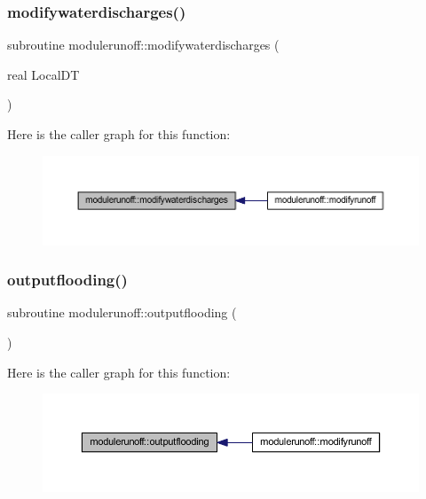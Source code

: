 \subsubsection{\texorpdfstring{modifywaterdischarges()}{modifywaterdischarges()}}
{\footnotesize\ttfamily subroutine modulerunoff\+::modifywaterdischarges (\begin{DoxyParamCaption}\item[{real}]{Local\+DT }\end{DoxyParamCaption})\hspace{0.3cm}{\ttfamily [private]}}

Here is the caller graph for this function\+:\nopagebreak
\begin{figure}[H]
\begin{center}
\leavevmode
\includegraphics[width=350pt]{namespacemodulerunoff_aadda9f593eae7a9fbebc7ae31f4e847b_icgraph}
\end{center}
\end{figure}
\mbox{\label{namespacemodulerunoff_a61882209b1d8802763f9fb32a5f34a38}} 
\subsubsection{\texorpdfstring{outputflooding()}{outputflooding()}}
{\footnotesize\ttfamily subroutine modulerunoff\+::outputflooding (\begin{DoxyParamCaption}{ }\end{DoxyParamCaption})\hspace{0.3cm}{\ttfamily [private]}}

Here is the caller graph for this function\+:\nopagebreak
\begin{figure}[H]
\begin{center}
\leavevmode
\includegraphics[width=350pt]{namespacemodulerunoff_a61882209b1d8802763f9fb32a5f34a38_icgraph}
\end{center}
\end{figure}
\mbox{\label{namespacemodulerunoff_ad52912e124d2d30970fdc6d5bd8c15cc}} 

